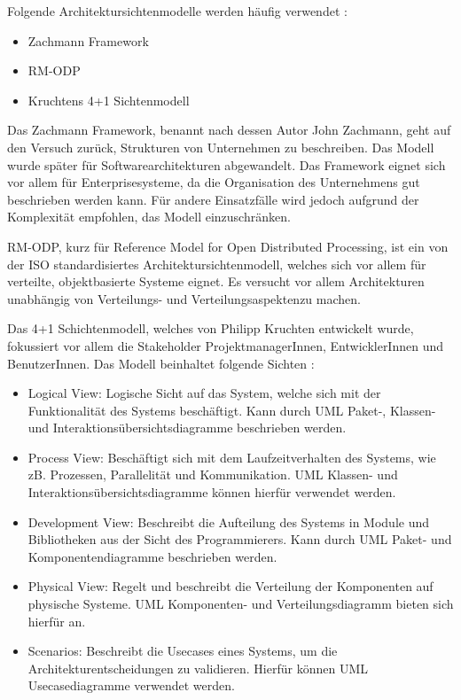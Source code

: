 Folgende Architektursichtenmodelle werden häufig verwendet \cite[S. 94]{softarch}:

\begin{itemize}
  \item Zachmann Framework
  \item RM-ODP
  \item Kruchtens 4+1 Sichtenmodell
\end{itemize}

Das Zachmann Framework, benannt nach dessen Autor John Zachmann, geht auf den Versuch zurück, Strukturen von Unternehmen zu beschreiben. Das Modell wurde später für Softwarearchitekturen abgewandelt. Das Framework eignet sich vor allem für Enterprisesysteme, da die Organisation des Unternehmens gut beschrieben werden kann. Für andere Einsatzfälle wird jedoch aufgrund der Komplexität empfohlen, das Modell einzuschränken. \cite[S. 94-95]{softarch}

RM-ODP, kurz für Reference Model for Open Distributed Processing, ist ein von der ISO standardisiertes Architektursichtenmodell, welches sich vor allem für verteilte, objektbasierte Systeme eignet. Es versucht vor allem Architekturen unabhängig \glqq von Verteilungs- und Verteilungsaspekten\grqq zu machen. \cite{ISO_RMODP}\cite[S. 97-98]{softarch}

Das 4+1 Schichtenmodell, welches von Philipp Kruchten entwickelt wurde, fokussiert vor allem die Stakeholder ProjektmanagerInnen, EntwicklerInnen und BenutzerInnen. Das Modell beinhaltet folgende Sichten \cite{kruch}\cite[S. 501-503]{appluml}:

\begin{itemize}
  \item Logical View: Logische Sicht auf das System, welche sich mit der Funktionalität des Systems beschäftigt. Kann durch UML Paket-, Klassen- und Interaktionsübersichtsdiagramme beschrieben werden.
  \item Process View: Beschäftigt sich mit dem Laufzeitverhalten des Systems, wie zB. Prozessen, Parallelität und Kommunikation. UML Klassen- und Interaktionsübersichtsdiagramme können hierfür verwendet werden.
  \item Development View: Beschreibt die Aufteilung des Systems in Module und Bibliotheken aus der Sicht des Programmierers. Kann durch UML Paket- und Komponentendiagramme beschrieben werden.
  \item Physical View: Regelt und beschreibt die Verteilung der Komponenten auf physische Systeme. UML Komponenten- und Verteilungsdiagramm bieten sich hierfür an.
  \item Scenarios: Beschreibt die Usecases eines Systems, um die Architekturentscheidungen zu validieren. Hierfür können UML Usecasediagramme verwendet werden.
\end{itemize}

